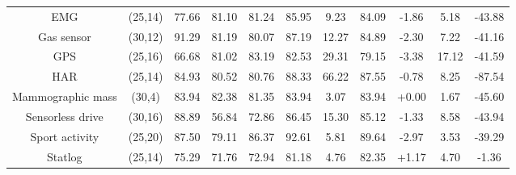 \begin{table*}[!htb]
{\begin{tabular}{|c||cc||cc||cc||cccc|}
 	EMG & (25,14) & 77.66 & 81.10 & 81.24 & 85.95 & 9.23 & 84.09 & \cellcolor{new_red!50} -1.86 & 5.18 & \cellcolor{new_green!70} -43.88 \\
 	Gas sensor & (30,12) & 91.29 & 81.19 & 80.07 & 87.19 & 12.27 & 84.89 & \cellcolor{new_red!50} -2.30 & 7.22 & \cellcolor{new_green!70} -41.16 \\
  	GPS & (25,16) & 66.68 & 81.02 & 83.19 & 82.53 & 29.31 & 79.15 & \cellcolor{new_red!50} -3.38 & 17.12 & \cellcolor{new_green!70} -41.59 \\
  	HAR & (25,14) & 84.93 & 80.52 & 80.76 & 88.33 & 66.22 & 87.55 & \cellcolor{new_red!50} -0.78 & 8.25 & \cellcolor{new_green!70} -87.54 \\
  	Mammographic mass & (30,4) & 83.94 & 82.38 & 81.35 & 83.94 & 3.07 & 83.94 & \cellcolor{new_green!70} +0.00 & 1.67 & \cellcolor{new_green!70} -45.60 \\
  	Sensorless drive & (30,16) & 88.89 & 56.84 & 72.86 & 86.45 & 15.30 & 85.12 & \cellcolor{new_red!50} -1.33 & 8.58 & \cellcolor{new_green!70} -43.94 \\
  	Sport activity & (25,20) & 87.50 & 79.11 & 86.37 & 92.61 & 5.81 & 89.64 & \cellcolor{new_red!50} -2.97 & 3.53 & \cellcolor{new_green!70} -39.29 \\
  	Statlog & (25,14) & 75.29 & 71.76 & 72.94 & 81.18 & 4.76 & 82.35 & \cellcolor{new_green!70} +1.17 & 4.70 & \cellcolor{new_green!70} -1.36 \\
 	\hline
	\end{tabular}
}
\end{table*} 
